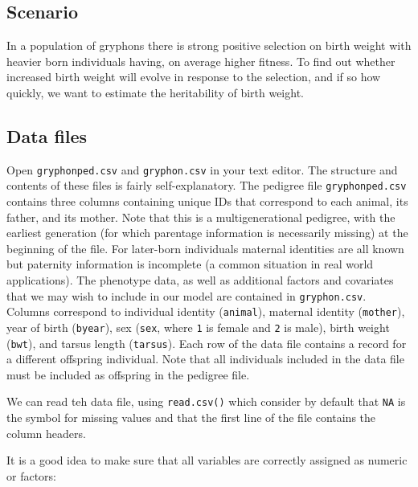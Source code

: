 \documentclass[12pt,]{book}
\begin{document}
\hypertarget{scenario}{%
\subsection{Scenario}\label{scenario}}

In a population of gryphons there is strong positive selection on birth weight with heavier born individuals having, on average higher fitness. To find out whether increased birth weight will evolve in response to the selection, and if so how quickly, we want to estimate the heritability of birth weight.

\hypertarget{data-files-1}{%
\subsection{Data files}\label{data-files-1}}

Open \texttt{gryphonped.csv} and \texttt{gryphon.csv} in your text editor. The structure and contents of these files is fairly self-explanatory. The pedigree file \texttt{gryphonped.csv} contains three columns containing unique IDs that correspond to each animal, its father, and its mother. Note that this is a multigenerational pedigree, with the earliest generation (for which parentage information is necessarily missing) at the beginning of the file. For later-born individuals maternal identities are all known but paternity information is incomplete (a common situation in real world applications).
The phenotype data, as well as additional factors and covariates that we may wish to include in our model are contained in \texttt{gryphon.csv}. Columns correspond to individual identity (\texttt{animal}), maternal identity (\texttt{mother}), year of birth (\texttt{byear}), sex (\texttt{sex}, where \texttt{1} is female and \texttt{2} is male), birth weight (\texttt{bwt}), and tarsus length (\texttt{tarsus}). Each row of the data file contains a record for a different offspring individual. Note that all individuals included in the data file must be included as offspring in the pedigree file.

We can read teh data file, using \texttt{read.csv()} which consider by default that \texttt{NA} is the symbol for missing values and that the first line of the file contains the column headers.

It is a good idea to make sure that all variables are correctly assigned as numeric or factors:
\end{document}
